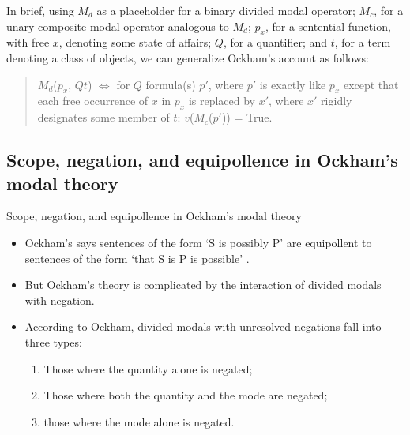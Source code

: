 \documentclass{beamer}
\begin{document}
\begin{frame}
	In brief, using $M_{d}$ as a placeholder for a binary divided modal operator; $M_{c}$, for a unary composite modal operator analogous to $M_{d}$; $p_{x}$, for a sentential function, with free $x$, denoting some state of affairs; $Q$, for a quantifier; and $t$, for a term denoting a class of objects, we can generalize Ockham's account as follows:
	\begin{quote}
		$M_{d}$($p_{x}$, $Qt$) $\Leftrightarrow$ for $Q$ formula(s) $p'$, where  $p'$ is exactly like $p_{x}$ except that each free occurrence of $x$ in $p_{x}$ is replaced by $x'$, where $x'$ rigidly designates some member of $t$: $v$($M_{c}$($p'$)) = True.
	\end{quote}
\end{frame}

\subsection{Scope, negation, and equipollence in Ockham's modal theory}
\begin{frame}{Scope, negation, and equipollence in Ockham's modal theory}
	\begin{itemize}
		\item Ockham's says sentences of the form `S is possibly P' are equipollent to sentences of the form `that S is P is possible' \cite[II. 9, p. 246; 10, p. 248]{OckhamSL2}. \pause 
		\item But Ockham's theory is complicated by the interaction of divided modals with negation. \pause
		\item According to Ockham, divided modals with unresolved negations fall into three types: \pause
		\begin{enumerate}
			\item Those where the quantity alone is negated; \pause 
			\item Those where both the quantity and the mode are negated; \pause 
			\item those where the mode alone is negated.
		\end{enumerate} 
	\end{itemize}
\end{frame}
\end{document}
